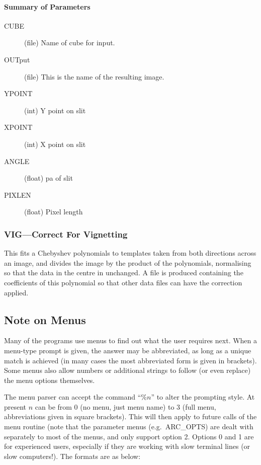 \documentclass[11pt,twoside]{article}
\newcommand{\xlabel}[1]{}
\begin{document}
\paragraph{Summary of Parameters}

\begin{description}
\item[CUBE] (file) Name of cube for input.
\item[OUTput] (file) This is the name of the resulting image.
\item[YPOINT] (int) Y point on slit
\item[XPOINT] (int) X point on slit
\item[ANGLE] (float) pa of slit
\item[PIXLEN] (float) Pixel length
\end{description}

\subsubsection{\xlabel{vigcorrect_for_vignetting}VIG---Correct For Vignetting}

This fits a Chebyshev polynomials to templates taken from both
directions across an image, and divides the image by the product of the
polynomials, normalising so that the data in the centre in unchanged.
A file is produced containing the coefficients of this polynomial so that
other data files can have the correction applied.

\clearpage

\subsection{\xlabel{note_on_menus}\label{note_on_menus}Note on Menus}

Many of the programs use menus to find out what the user requires next.
When a menu-type prompt is given, the answer may be abbreviated, as long
as a unique match is achieved (in many cases the most abbreviated form
is given in brackets).
Some menus also allow numbers or additional strings to follow (or even
replace) the menu options themselves.

The menu parser can accept the command ``\%$n$'' to alter the prompting
style.
At present $n$ can be from 0 (no menu, just menu name) to 3 (full menu,
abbreviations given in square brackets).
This will then apply to future calls of the menu routine (note that the
parameter menus (e.g.\ ARC\_OPTS) are dealt with separately to most of
the menus, and only support option 2.
Options 0 and 1 are for experienced users, especially if they are
working with slow terminal lines (or slow computers!).
The formats are as below:
\end{document}

